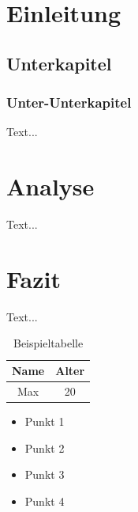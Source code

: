 \documentclass{article}
\begin{document}
 
\tableofcontents 
\newpage

\section{Einleitung} 
\subsection{Unterkapitel} 
\subsubsection{Unter-Unterkapitel}
Text...

\section{Analyse} 
Text...

\section{Fazit} 
Text...


\begin{table}[h] 
\centering 
\begin{tabular}{|c|c|} 
\hline Name & Alter \\ 
\hline Max & 20 \\ 
\hline 
\end{tabular} 
\caption{Beispieltabelle} 
\end{table}

\begin{itemize} 
\item Punkt 1 
\item Punkt 2 
\item Punkt 3 
\item Punkt 4


\end{itemize}
\end{document}
